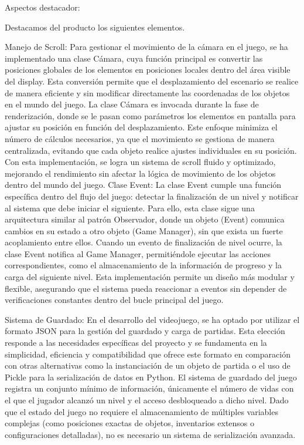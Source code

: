 \documentclass[12pt,a4paper,twoside,spanish]{article}      %
\begin{document}
Aspectos destacador:

Destacamos del producto los siguientes elementos.

Manejo de Scroll: Para gestionar el movimiento de la cámara en el juego, se ha implementado una clase Cámara, cuya función principal es convertir las posiciones globales de los elementos en posiciones locales dentro del área visible del display. Esta conversión permite que el desplazamiento del escenario se realice de manera eficiente y sin modificar directamente las coordenadas de los objetos en el mundo del juego.
La clase Cámara es invocada durante la fase de renderización, donde se le pasan como parámetros los elementos en pantalla para ajustar su posición en función del desplazamiento. Este enfoque minimiza el número de cálculos necesarios, ya que el movimiento se gestiona de manera centralizada, evitando que cada objeto realice ajustes individuales en su posición. Con esta implementación, se logra un sistema de scroll fluido y optimizado, mejorando el rendimiento sin afectar la lógica de movimiento de los objetos dentro del mundo del juego.
Clase Event: La clase Event cumple una función específica dentro del flujo del juego: detectar la finalización de un nivel y notificar al sistema que debe iniciar el siguiente. Para ello, esta clase sigue una arquitectura similar al patrón Observador, donde un objeto (Event) comunica cambios en su estado a otro objeto (Game Manager), sin que exista un fuerte acoplamiento entre ellos.
Cuando un evento de finalización de nivel ocurre, la clase Event notifica al Game Manager, permitiéndole ejecutar las acciones correspondientes, como el almacenamiento de la información de progreso y la carga del siguiente nivel. Esta implementación permite un diseño más modular y flexible, asegurando que el sistema pueda reaccionar a eventos sin depender de verificaciones constantes dentro del bucle principal del juego.

Sistema de Guardado: En el desarrollo del videojuego, se ha optado por utilizar el formato JSON para la gestión del guardado y carga de partidas. Esta elección responde a las necesidades específicas del proyecto y se fundamenta en la simplicidad, eficiencia y compatibilidad que ofrece este formato en comparación con otras alternativas como la instanciación de un objeto de partida o el uso de Pickle para la serialización de datos en Python.  
El sistema de guardado del juego registra un conjunto mínimo de información, únicamente el número de vidas con el que el jugador alcanzó un nivel y el acceso desbloqueado a dicho nivel. Dado que el estado del juego no requiere el almacenamiento de múltiples variables complejas (como posiciones exactas de objetos, inventarios extensos o configuraciones detalladas), no es necesario un sistema de serialización avanzada.
\end{document}
